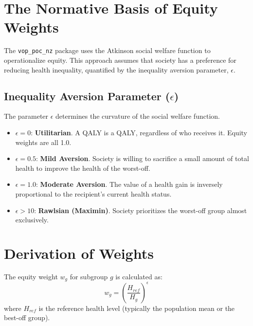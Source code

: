 \documentclass{article}
\author{Dylan A. Mordaunt\\Victoria University of Wellington}
\newcommand{\pkg}[1]{\texttt{#1}}
\newcommand{\myabstract}{}
\begin{document}
\maketitle
\begin{abstract}
\myabstract
\end{abstract}

\section{The Normative Basis of Equity Weights}

The \pkg{vop\_poc\_nz} package uses the Atkinson social welfare function to operationalize equity.
This approach assumes that society has a preference for reducing health inequality, quantified by the inequality aversion parameter, $\epsilon$.

\subsection{Inequality Aversion Parameter ($\epsilon$)}

The parameter $\epsilon$ determines the curvature of the social welfare function.
\begin{itemize}
    \item $\epsilon = 0$: \textbf{Utilitarian}. A QALY is a QALY, regardless of who receives it. Equity weights are all 1.0.
    \item $\epsilon = 0.5$: \textbf{Mild Aversion}. Society is willing to sacrifice a small amount of total health to improve the health of the worst-off.
    \item $\epsilon = 1.0$: \textbf{Moderate Aversion}. The value of a health gain is inversely proportional to the recipient's current health status.
    \item $\epsilon > 10$: \textbf{Rawlsian (Maximin)}. Society prioritizes the worst-off group almost exclusively.
\end{itemize}

\section{Derivation of Weights}

The equity weight $w_g$ for subgroup $g$ is calculated as:
\begin{equation}
w_g = \left( \frac{H_{ref}}{H_g} \right)^\epsilon
\end{equation}
where $H_{ref}$ is the reference health level (typically the population mean or the best-off group).
\end{document}

